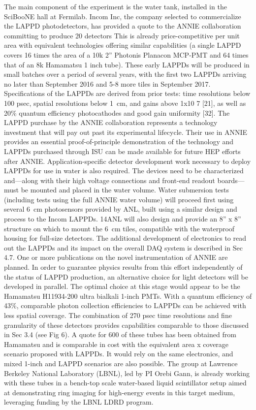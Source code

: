 The main component of the experiment is the water tank, installed in the SciBooNE hall %
at Fermilab.
Incom Inc, the company selected to commercialize the LAPPD photodetectors, has provided a
quote to the ANNIE collaboration committing to produce 20 detectors
This is already price-competitive per unit area with equivalent
technologies offering similar capabilities (a single LAPPD covers 16 times the area of a 10k 2”
Photonis Planacon MCP-PMT and 64 times that of an 8k Hamamatsu 1 inch tube).
These early LAPPDs will be produced in small batches over a period of several years, %
with the first two LAPPDs arriving no later than September 2016 and 5-8 more tiles in September 2017.
Specifications of the LAPPDs are derived from prior tests: time resolutions below 100 psec, %
spatial resolutions below 1~cm, and gains above 1x10 7 [21], as well as 20\% quantum %
efficiency photocathodes and good gain uniformity [32].
The LAPPD purchase by the ANNIE collaboration represents a technology investment that will %
pay out past its experimental lifecycle.
Their use in ANNIE provides an essential proof-of-principle %
demonstration of the technology and LAPPDs purchased through ISU can be made available for %
future HEP efforts after ANNIE.
Application-specific detector development work necessary to deploy LAPPDs for use %
in water is also required.
The devices need to be characterized and—along with their high voltage connections %
and front-end readout boards—must be mounted and placed in the water volume.%
Water submersion tests (including tests using the full ANNIE water volume) will proceed %
first using several 6~cm photosensors provided by ANL, built using a similar design and %
process to the Incom LAPPDs.
14ANL will also design and provide an 8” x 8” structure on which to mount the 6~cm tiles, %
compatible with the waterproof housing for full-size detectors.
The additional development of electronics to read out the LAPPDs and its impact on the %
overall DAQ system is described in Sec 4.7.
One or more publications on the novel instrumentation of ANNIE are planned.
In order to guarantee physics results from this effort independently of the status of LAPPD %
production, an alternative choice for light detectors will be developed in parallel.
The optimal choice at this stage would appear to be the Hamamatsu H11934-200 ultra %
bialkali 1-inch PMTs.
With a quantum efficiency of 43\%, comparable photon collection efficiencies to %
LAPPDs can be achieved with less spatial coverage.
The combination of 270 psec time resolutions and fine granularity of these detectors %
provides capabilities comparable to those discussed in Sec 3.4 (see Fig 6).
A quote for 600 of these tubes has been obtained from Hamamatsu and is comparable in cost %
with the equivalent area x coverage scenario proposed with LAPPDs.
It would rely on the same electronics, and mixed 1-inch and LAPPD scenarios are also possible.
The group at Lawrence Berkeley National Laboratory (LBNL), led by PI Orebi Gann, %
is already working with these tubes in a bench-top scale water-based liquid %
scintillator setup aimed at demonstrating ring imaging for high-energy events in this target medium, %
leveraging funding by the LBNL LDRD program.

